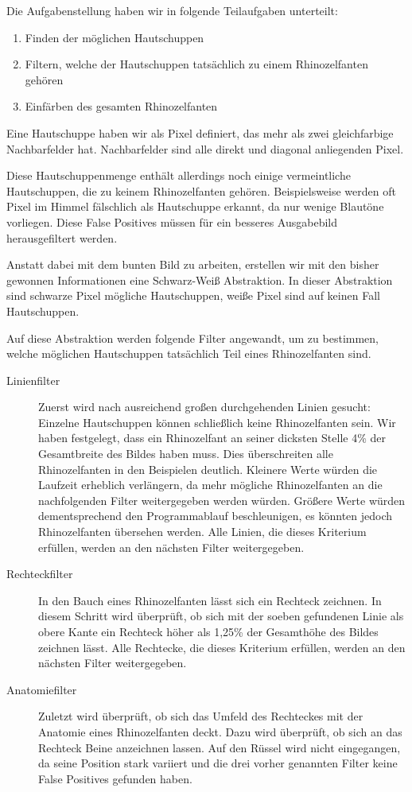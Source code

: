 Die Aufgabenstellung haben wir in folgende Teilaufgaben unterteilt:
\begin{enumerate}
	\item Finden der möglichen Hautschuppen
	\item Filtern, welche der Hautschuppen tatsächlich zu einem Rhinozelfanten gehören
	\item Einfärben des gesamten Rhinozelfanten
\end{enumerate}

Eine Hautschuppe haben wir als Pixel definiert, das mehr als zwei gleichfarbige Nachbarfelder hat. Nachbarfelder sind alle direkt und diagonal anliegenden Pixel.

Diese Hautschuppenmenge enthält allerdings noch einige vermeintliche Hautschuppen, die zu keinem Rhinozelfanten gehören. Beispielsweise werden oft Pixel im Himmel fälschlich als Hautschuppe erkannt, da nur wenige Blautöne vorliegen. Diese False Positives müssen für ein besseres Ausgabebild herausgefiltert werden.

Anstatt dabei mit dem bunten Bild zu arbeiten, erstellen wir mit den bisher gewonnen Informationen eine Schwarz-Weiß Abstraktion. In dieser Abstraktion sind schwarze Pixel mögliche Hautschuppen, weiße Pixel sind auf keinen Fall Hautschuppen.

Auf diese Abstraktion werden folgende Filter angewandt, um zu bestimmen, welche möglichen Hautschuppen tatsächlich Teil eines Rhinozelfanten sind.

\begin{description}
	\item[Linienfilter] Zuerst wird nach ausreichend großen durchgehenden Linien gesucht: Einzelne Hautschuppen können schließlich keine Rhinozelfanten sein. Wir haben festgelegt, dass ein Rhinozelfant an seiner dicksten Stelle 4\% der Gesamtbreite des Bildes haben muss. Dies überschreiten alle Rhinozelfanten in den Beispielen deutlich. Kleinere Werte würden die Laufzeit erheblich verlängern, da mehr mögliche Rhinozelfanten an die nachfolgenden Filter weitergegeben werden würden. Größere Werte würden dementsprechend den Programmablauf beschleunigen, es könnten jedoch Rhinozelfanten übersehen werden. Alle Linien, die dieses Kriterium erfüllen, werden an den nächsten Filter weitergegeben.
	\item[Rechteckfilter] In den Bauch eines Rhinozelfanten lässt sich ein Rechteck zeichnen. In diesem Schritt wird überprüft, ob sich mit der soeben gefundenen Linie als obere Kante ein Rechteck höher als 1,25\% der Gesamthöhe des Bildes zeichnen lässt. Alle Rechtecke, die dieses Kriterium erfüllen, werden an den nächsten Filter weitergegeben.
	\item[Anatomiefilter] Zuletzt wird überprüft, ob sich das Umfeld des Rechteckes mit der Anatomie eines Rhinozelfanten deckt. Dazu wird überprüft, ob sich an das Rechteck Beine anzeichnen lassen. Auf den Rüssel wird nicht eingegangen, da seine Position stark variiert und die drei vorher genannten Filter keine False Positives gefunden haben.
\end{description}

